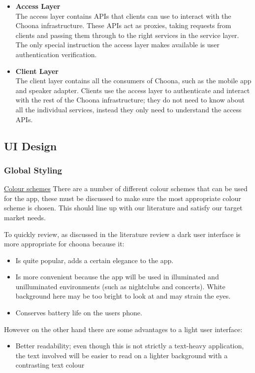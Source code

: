 \begin{itemize}
  \item \textbf{Access Layer}\\
    The access layer contains APIs that clients can use to interact with the Choona infrastructure. These APIs act as proxies, taking requests from clients and passing them through to the right services in the service layer. The only special instruction the access layer makes available is user authentication verification.

  \item \textbf{Client Layer}\\
    The client layer contains all the consumers of Choona, such as the mobile app and speaker adapter. Clients use the access layer to authenticate and interact with the rest of the Choona infrastructure; they do not need to know about all the individual services, instead they only need to understand the access APIs.
\end{itemize}

\subsection{UI Design}

\subsubsection*{Global Styling}

\noindent\underline{Colour schemes}\newline
There are a number of different colour schemes that can be used for the app, these must be discussed to make sure the most appropriate colour scheme is chosen.  This should line up with our literature and satisfy our target market needs.

To quickly review, as discussed in the literature review a dark user interface is more appropriate for choona because it:
\begin{itemize}
\item Is quite popular, adds a certain elegance to the app.
\item Is more convenient because the app will be used in illuminated and unilluminated environments (such as nightclubs and concerts). White background here may be too bright to look at and may strain the eyes.
\item Conserves battery life on the users phone.
\end{itemize}

\noindent However on the other hand there are some advantages to a light user interface:
\begin{itemize}
\item Better readability; even though this is not strictly a text-heavy application, the text involved will be easier to read on a lighter background with a contrasting text colour
\end{itemize}

